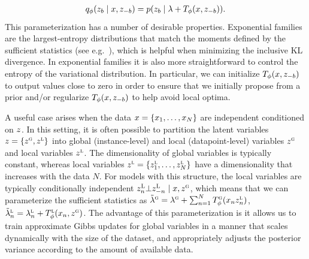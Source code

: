 \documentclass{article}
\theoremstyle{definition}
\begin{document}
\begin{align*}
    q_\phi(z_b \mid x, z_{-b}) 
    = 
    p(z_b \mid \lambda + T_\phi(x, z_{-b}))
    .
\end{align*}
This parameterization has a number of desirable properties. Exponential families are the largest-entropy distributions that match the moments defined by the sufficient statistics (see e.g.~\citet{wainwright2008graphical}), which is helpful when minimizing the inclusive KL divergence. In exponential families it is also more straightforward to control the entropy of the variational distribution. In particular, we can initialize $T_\phi(x, z_{-b})$ to output values close to zero in order to ensure that we initially propose from a prior and/or regularize $T_\phi(x, z_{-b})$ to help avoid local optima.

A useful case arises when the data $x = \{x_1, \ldots, x_N\}$ are independent conditioned on $z$. In this setting, it is often possible to partition the latent variables $z = \{z^\textsc{g}, z^\textsc{l}\}$ into global (instance-level) and local (datapoint-level) variables $z^{\textsc{g}}$ and local variables $z^{\textsc{l}}$. The dimensionality of global variables is typically constant, whereas local variables $z^\textsc{l} = \{z^\textsc{l}_1, \ldots, z^\textsc{l}_N\}$ have a dimensionality that increases with the data $N$. For models with this structure, the local variables are typically conditionally independent $z^\textsc{L}_n \bot z^\textsc{L}_{-n} \mid x, z^\textsc{g}$, which means that we can parameterize the sufficient statistics as $\tilde{\lambda}^\textsc{g}=\lambda^\textsc{g} + 
    \sum_{n=1}^N T^\textsc{g}_\phi(x_n z^\textsc{l}_{n})$, $\tilde{\lambda}^\textsc{l}_n=\lambda^\textsc{l}_n + T^\textsc{l}_\phi(x_n, z^\textsc{g})$.
The advantage of this parameterization is it allows us to train approximate Gibbs updates for global variables in a manner that scales dynamically with the size of the dataset, and appropriately adjusts the posterior variance according to the amount of available data.
\end{document}
